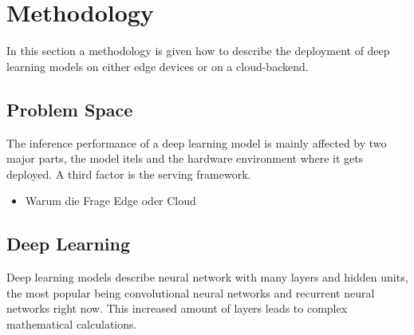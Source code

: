 \chapter{Methodology}
In this section a methodology is given how to describe the deployment of deep learning models on either edge devices or on a cloud-backend.
\section{Problem Space}
The inference performance of a deep learning model is mainly affected by two major parts, the model itels and the hardware environment where it gets deployed. A third factor is the serving framework.
\begin{itemize}
    \item Warum die Frage Edge oder Cloud
\end{itemize}
\section{Deep Learning}
Deep learning models describe neural network with many layers and hidden units, the most popular being convolutional neural networks and recurrent neural networks right now. This increased amount of layers leads to complex mathematical calculations.


